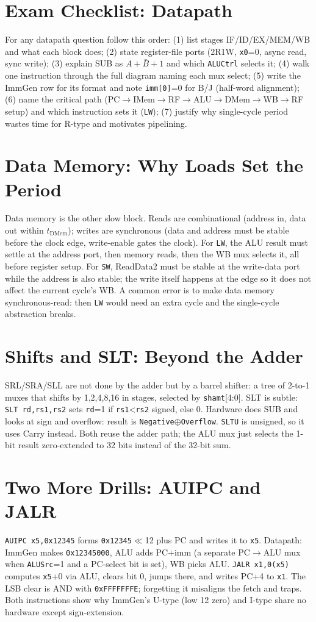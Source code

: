 \section{Exam Checklist: Datapath}
For any datapath question follow this order: (1) list stages IF/ID/EX/MEM/WB and what each block does; (2) state register-file ports (2R1W, \texttt{x0}=0, async read, sync write); (3) explain SUB as $A+\bar{B}+1$ and which \texttt{ALUCtrl} selects it; (4) walk one instruction through the full diagram naming each mux select; (5) write the ImmGen row for its format and note \texttt{imm[0]}=0 for B/J (half-word alignment); (6) name the critical path (PC$\to$IMem$\to$RF$\to$ALU$\to$DMem$\to$WB$\to$RF setup) and which instruction sets it (\texttt{LW}); (7) justify why single-cycle period wastes time for R-type and motivates pipelining.


\section{Data Memory: Why Loads Set the Period}
Data memory is the other slow block. Reads are combinational (address in, data out within $t_{\text{DMem}}$); writes are synchronous (data and address must be stable before the clock edge, write-enable gates the clock). For \texttt{LW}, the ALU result must settle at the address port, then memory reads, then the WB mux selects it, all before register setup. For \texttt{SW}, ReadData2 must be stable at the write-data port while the address is also stable; the write itself happens at the edge so it does not affect the current cycle's WB. A common error is to make data memory synchronous-read: then \texttt{LW} would need an extra cycle and the single-cycle abstraction breaks.

\section{Shifts and SLT: Beyond the Adder}
SRL/SRA/SLL are not done by the adder but by a barrel shifter: a tree of 2-to-1 muxes that shifts by 1,2,4,8,16 in stages, selected by \texttt{shamt}[4:0]. SLT is subtle: \texttt{SLT rd,rs1,rs2} sets \texttt{rd}=1 if \texttt{rs1}<\texttt{rs2} signed, else 0. Hardware does SUB and looks at sign and overflow: result is \texttt{Negative}$\oplus$\texttt{Overflow}. \texttt{SLTU} is unsigned, so it uses Carry instead. Both reuse the adder path; the ALU mux just selects the 1-bit result zero-extended to 32 bits instead of the 32-bit sum.

\section{Two More Drills: AUIPC and JALR}
\texttt{AUIPC x5,0x12345} forms \texttt{0x12345}$\ll$12 plus PC and writes it to \texttt{x5}. Datapath: ImmGen makes \texttt{0x12345000}, ALU adds PC+imm (a separate PC$\to$ALU mux when \texttt{ALUSrc}=1 and a PC-select bit is set), WB picks ALU. \texttt{JALR x1,0(x5)} computes \texttt{x5}+0 via ALU, clears bit 0, jumps there, and writes PC+4 to \texttt{x1}. The LSB clear is AND with \texttt{0xFFFFFFFE}; forgetting it misaligns the fetch and traps. Both instructions show why ImmGen's U-type (low 12 zero) and I-type share no hardware except sign-extension.


